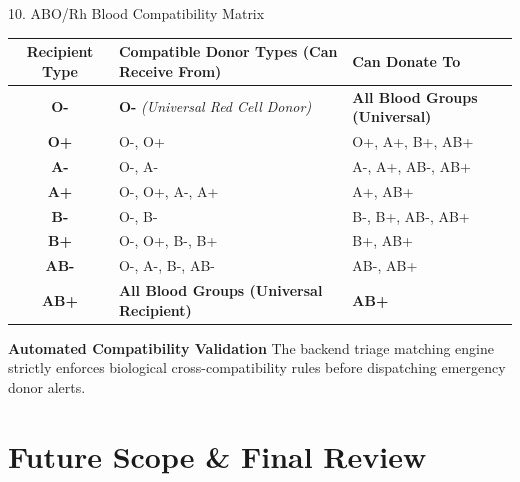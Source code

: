 \documentclass[aspectratio=169,10pt]{beamer}
\begin{document}
\begin{frame}{10. ABO/Rh Blood Compatibility Matrix}
    \begin{table}[H]
        \centering
        \scriptsize
        \begin{tabular}{cll}
            \toprule
            \textbf{Recipient Type} & \textbf{Compatible Donor Types (Can Receive From)} & \textbf{Can Donate To} \\
            \midrule
            \rowcolor{red!10} \textbf{O-} & \textbf{O-} \textit{(Universal Red Cell Donor)} & \textbf{All Blood Groups (Universal)} \\
            \textbf{O+} & O-, O+ & O+, A+, B+, AB+ \\
            \textbf{A-} & O-, A- & A-, A+, AB-, AB+ \\
            \textbf{A+} & O-, O+, A-, A+ & A+, AB+ \\
            \textbf{B-} & O-, B- & B-, B+, AB-, AB+ \\
            \textbf{B+} & O-, O+, B-, B+ & B+, AB+ \\
            \textbf{AB-} & O-, A-, B-, AB- & AB-, AB+ \\
            \rowcolor{blue!10} \textbf{AB+} & \textbf{All Blood Groups (Universal Recipient)} & \textbf{AB+} \\
            \bottomrule
        \end{tabular}
    \end{table}
    \vspace{-0.2cm}
    \begin{block}{\textbf{Automated Compatibility Validation}}
        \scriptsize The backend triage matching engine strictly enforces biological cross-compatibility rules before dispatching emergency donor alerts.
    \end{block}
\end{frame}

\section{Future Scope \& Final Review}
\end{document}
